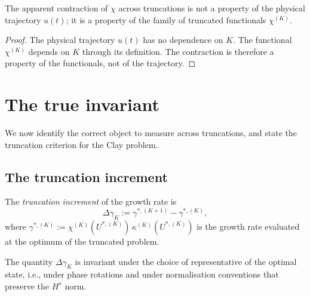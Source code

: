 \begin{corollary}\label{part-4:cor:contraction-not-physical}
The apparent contraction of $\chi$ across truncations is not a 
property of the physical trajectory $u(t)$; it is a property of the 
family of truncated functionals $\chi^{(K)}$.
\end{corollary}

\begin{proof}
The physical trajectory $u(t)$ has no dependence on $K$. The 
functional $\chi^{(K)}$ depends on $K$ through its definition. The 
contraction is therefore a property of the functionals, not of the 
trajectory.
\end{proof}

\section{The true invariant}
\label{part-4:sec:invariant}

We now identify the correct object to measure across truncations, 
and state the truncation criterion for the Clay problem.

\subsection{The truncation increment}
\label{part-4:ssec:increment}

\begin{definition}\label{part-4:def:increment}
The \emph{truncation increment} of the growth rate is
\begin{equation}\label{part-4:eq:increment-def}
\boxed{
\Delta\gamma_K := \gamma^{\ast,(K+1)} - \gamma^{\ast,(K)},
}
\end{equation}
where $\gamma^{\ast,(K)} := \chi^{(K)}(U^{\ast,(K)})\,\kappa^{(K)}(U^{\ast,(K)})$ 
is the growth rate evaluated at the optimum of the truncated problem.
\end{definition}

\begin{proposition}\label{part-4:prop:increment-inv}
The quantity $\Delta\gamma_K$ is invariant under the choice of 
representative of the optimal state, i.e., under phase rotations 
and under normalisation conventions that preserve the $H^s$ norm.
\end{proposition}

